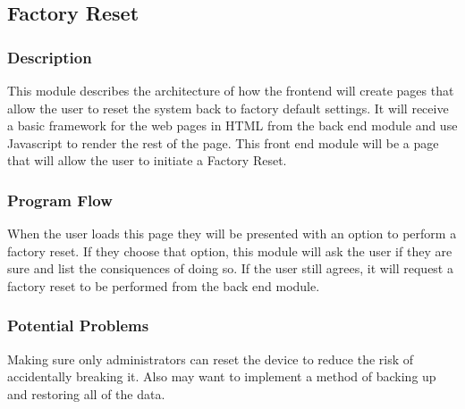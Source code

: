 
\subsection{Factory Reset}

\subsubsection{Description}

This module describes the architecture of how the frontend will create pages that allow the user to reset the system back to factory default settings.
It will receive a basic framework for the web pages in HTML from the back end module and use Javascript to render the rest of the page. 
This front end module will be a page that will allow the user to initiate a Factory Reset.

\subsubsection{Program Flow}

When the user loads this page they will be presented with an option to perform a factory reset.
If they choose that option, this module will ask the user if they are sure and list the consiquences of doing so.
If the user still agrees, it will request a factory reset to be performed from the back end module.

\subsubsection{Potential Problems}

Making sure only administrators can reset the device to reduce the risk of accidentally breaking it.
Also may want to implement a method of backing up and restoring all of the data.
